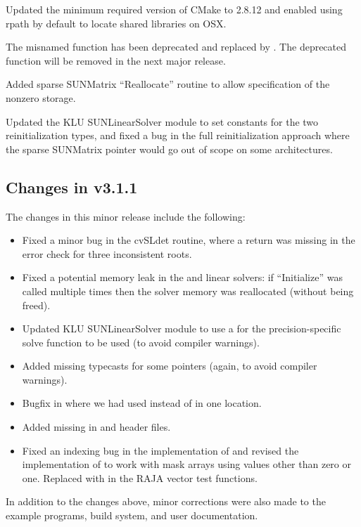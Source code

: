 Updated the minimum required version of CMake to 2.8.12 and enabled
using rpath by default to locate shared libraries on OSX.

The misnamed function  has been
deprecated and replaced by . The deprecated
function  will be removed in the next
major release.

Added sparse SUNMatrix ``Reallocate'' routine to allow specification of
the nonzero storage.

Updated the KLU SUNLinearSolver module to set constants for the two
reinitialization types, and fixed a bug in the full reinitialization
approach where the sparse SUNMatrix pointer would go out of scope on
some architectures.

\subsection*{Changes in v3.1.1}

The changes in this minor release include the following:
\begin{itemize}
\item Fixed a minor bug in the cvSLdet routine, where a return was missing
  in the error check for three inconsistent roots.

\item Fixed a potential memory leak in the {\spgmr} and {\spfgmr} linear
  solvers: if ``Initialize'' was called multiple times then the solver
  memory was reallocated (without being freed).
  
\item Updated KLU SUNLinearSolver module to use a  for the
  precision-specific solve function to be used (to avoid compiler 
  warnings).  

\item Added missing typecasts for some  pointers (again, to
  avoid compiler warnings). 

\item Bugfix in  where we had used 
  instead of  in one location.

\item Added missing  in {\nvector} and {\sunmatrix}
  header files.

\item Fixed an indexing bug in the {\cuda} {\nvector} implementation of
   and revised the {\raja} {\nvector} implementation of
   to work with mask arrays using values other than zero or
  one. Replaced  with  in the RAJA vector test functions.
\end{itemize}
In addition to the changes above, minor corrections were also made to the
example programs, build system, and user documentation.

